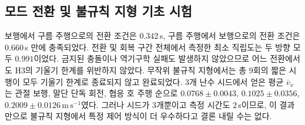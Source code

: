 \begin{table}[t]
\caption{계단 상단 도달 결과(결정론적 1회)}
\label{tab:stairs-ko}
\centering\small
{}
\end{table}

\subsection{모드 전환 및 불규칙 지형 기초 시험}

보행에서 구름 주행으로의 전환 조건은 $0.342\,$s, 구름 주행에서 보행으로의 전환
조건은 $0.660\,$s 만에 충족되었다. 전환 및 회복 구간 전체에서 측정한 최소
직립도는 두 방향 모두 $0.991$이었다. 금지된 충돌이나 역기구학 실패도 발생하지
않았으므로 어느 전환에서도 H3의 기울기 한계를 위반하지 않았다. 무작위 불규칙
지형에서는 총 9회의 짧은 시행이 모두 기울기 한계로 종료되지 않고 완료되었다.
3개 난수 시드에서 얻은 평균 $\bar v_x$는 관절 보행, 말단 단독 회전, 협응 호
주행 순으로 $0.0768\pm0.0043$, $0.1025\pm0.0356$,
$0.2009\pm0.0126\,\mathrm{m\,s^{-1}}$였다. 그러나 시드가 3개뿐이고 측정 시간도
$2\,$s이므로, 이 결과만으로 불규칙 지형에서 특정 제어 방식이 더 우수하다고
결론 내릴 수는 없다.

